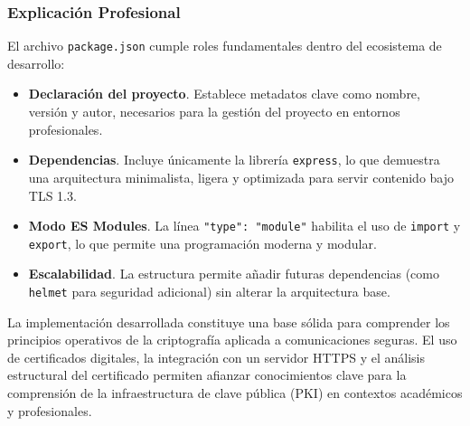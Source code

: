 \subsubsection*{Explicación Profesional}

El archivo \texttt{package.json} cumple roles fundamentales dentro del ecosistema de desarrollo:

\begin{itemize}
  \item \textbf{Declaración del proyecto}.  
  Establece metadatos clave como nombre, versión y autor, necesarios para la gestión del proyecto en entornos profesionales.

  \item \textbf{Dependencias}.  
  Incluye únicamente la librería \texttt{express}, lo que demuestra una arquitectura minimalista, ligera y optimizada para servir contenido bajo TLS 1.3.

  \item \textbf{Modo ES Modules}.  
  La línea \texttt{"type": "module"} habilita el uso de \texttt{import} y \texttt{export}, lo que permite una programación moderna y modular.

  \item \textbf{Escalabilidad}.  
  La estructura permite añadir futuras dependencias (como \texttt{helmet} para seguridad adicional) sin alterar la arquitectura base.
\end{itemize}

La implementación desarrollada constituye una base sólida para comprender los principios operativos de la criptografía aplicada a comunicaciones seguras. El uso de certificados digitales, la integración con un servidor HTTPS y el análisis estructural del certificado permiten afianzar conocimientos clave para la comprensión de la infraestructura de clave pública (PKI) en contextos académicos y profesionales.
